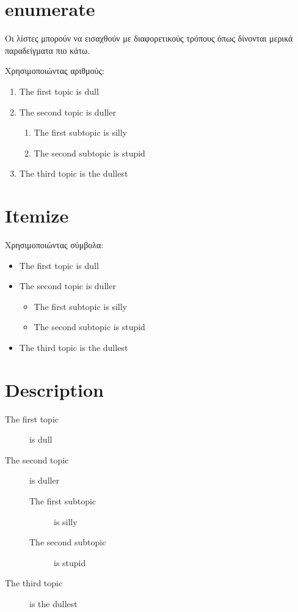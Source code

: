 \section*{enumerate}
Οι λίστες μπορούν να εισαχθούν με διαφορετικούς τρόπους όπως δίνονται μερικά παραδείγματα πιο κάτω.

Χρησιμοποιώντας αριθμούς:
\begin{enumerate}
\item The first topic is dull
\item The second topic is duller
\begin{enumerate}
\item The first subtopic is silly
\item The second subtopic is stupid
\end{enumerate}
\item The third topic is the dullest
\end{enumerate}


\section*{Itemize}
Χρησιμοποιώντας σύμβολα:
\begin{itemize}
\item The first topic is dull
\item The second topic is duller
\begin{itemize}
\item The first subtopic is silly
\item The second subtopic is stupid
\end{itemize}
\item The third topic is the dullest
\end{itemize}

\section*{Description}
\begin{description}
\item[The first topic] is dull
\item[The second topic] is duller
\begin{description}
\item[The first subtopic] is silly
\item[The second subtopic] is stupid
\end{description}
\item[The third topic] is the dullest
\end{description}


\clearpage


